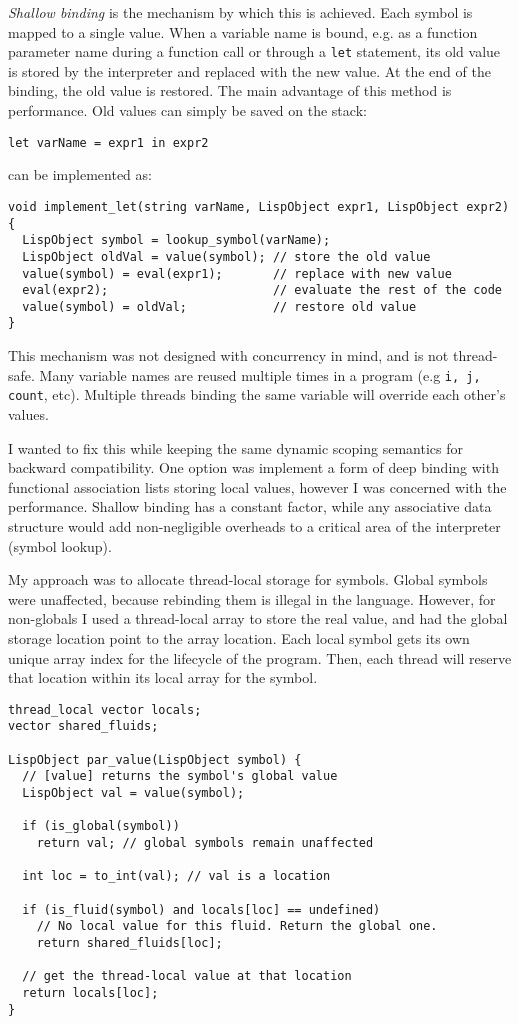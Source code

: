 \emph{Shallow binding} is the mechanism by which this is achieved. Each symbol is mapped to a single value.
When a variable name is bound, e.g. as a function parameter name during a function call or through a
\texttt{let} statement, its old value is stored by the interpreter and replaced with the new value. At the end of the binding,
the old value is restored. The main advantage of this method is performance. Old values can simply be saved
on the stack:
\begin{verbatim}
let varName = expr1 in expr2
\end{verbatim}

can be implemented as:

\begin{verbatim}
void implement_let(string varName, LispObject expr1, LispObject expr2) {
  LispObject symbol = lookup_symbol(varName);
  LispObject oldVal = value(symbol); // store the old value
  value(symbol) = eval(expr1);       // replace with new value
  eval(expr2);                       // evaluate the rest of the code
  value(symbol) = oldVal;            // restore old value
}
\end{verbatim}

This mechanism was not designed with concurrency in mind, and is not thread-safe.
Many variable names are reused multiple times in a program (e.g \texttt{i, j, count}, etc).
Multiple threads binding the same variable will override each other's values.

I wanted to fix this while keeping the same dynamic scoping semantics for backward compatibility.
One option was implement a form of deep binding with functional association lists storing local values,
however I was concerned with the performance. Shallow binding has a constant factor, while any
associative data structure would add non-negligible overheads to a critical area of the
interpreter (symbol lookup).

My approach was to allocate thread-local storage for symbols.
Global symbols were unaffected, because rebinding them is illegal in the language.
However, for non-globals I used a thread-local array to store the real value, and had the global storage
location point to the array location. Each local symbol gets its own unique array index for the lifecycle
of the program. Then, each thread will reserve that location within its local array for the symbol.

\begin{verbatim}
thread_local vector locals;
vector shared_fluids;

LispObject par_value(LispObject symbol) {
  // [value] returns the symbol's global value
  LispObject val = value(symbol);

  if (is_global(symbol))
    return val; // global symbols remain unaffected

  int loc = to_int(val); // val is a location

  if (is_fluid(symbol) and locals[loc] == undefined)
    // No local value for this fluid. Return the global one.
    return shared_fluids[loc];

  // get the thread-local value at that location
  return locals[loc];
}
\end{verbatim}

